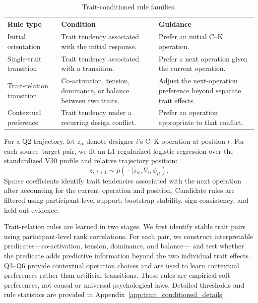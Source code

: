\begin{table}[t]
\centering
\small
\caption{Trait-conditioned rule families.}
\label{tab:trait_conditioned_rules}
\begin{tabular}{p{} p{} p{}}
\toprule
\textbf{Rule type} & \textbf{Condition} & \textbf{Guidance} \\
\midrule
Initial orientation & Trait tendency associated with the initial response. &
Prefer an initial C--K operation. \\
Single-trait transition & Trait tendency associated with a transition. &
Prefer a next operation given the current operation. \\
Trait-relation transition & Co-activation, tension, dominance, or balance
between two traits. & Adjust the next-operation preference beyond separate
trait effects. \\
Contextual preference & Trait tendency under a recurring design conflict. &
Prefer an operation appropriate to that conflict. \\
\bottomrule
\end{tabular}
\end{table}

For a Q2 trajectory, let $z_{it}$ denote designer $i$'s C--K operation at
position $t$. For each source--target pair, we fit an L1-regularized logistic
regression over the standardized V30 profile and relative trajectory position:
\begin{equation}
z_{i,t+1}\sim p(\,\cdot\mid z_{it},V_i,\phi_{it}).
\label{eq:tcktm_transition}
\end{equation}
Sparse coefficients identify trait tendencies associated with the next
operation after accounting for the current operation and position. Candidate
rules are filtered using participant-level support, bootstrap stability, sign
consistency, and held-out evidence.

Trait-relation rules are learned in two stages. We first identify stable trait
pairs using participant-level rank correlations. For each pair, we construct
interpretable predicates---co-activation, tension, dominance, and balance---
and test whether the predicate adds predictive information beyond the two
individual trait effects. Q3--Q6 provide contextual operation choices and are
used to learn contextual preferences rather than artificial transitions.
These rules are empirical soft preferences, not causal or universal
psychological laws. Detailed thresholds and rule statistics are provided in
Appendix~\ref{app:trait_conditioned_details}.

